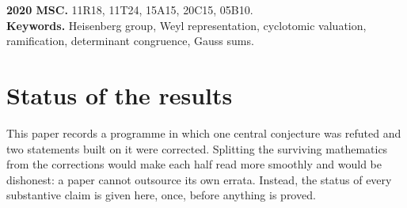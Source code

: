 \documentclass[11pt]{article}
\theoremstyle{plain}
\theoremstyle{definition}
\newcommand{\tr}{\operatorname{tr}}
\newcommand{\vlam}{v_\lambda}
\begin{document}
\begin{abstract}
The congruence reduces to an identity about the power sums $\tr(D^m)$, and the
main structural result of the paper concerns those. Expanding $\tr(D^m)$ over
$m$-tuples of total displacement zero and grouping by cyclic orbit gives
classes $S_d$ indexed by the divisors of $m$. We prove a \emph{sieve theorem}:
if $e$ denotes the order of the generating character and $t\mid m$ satisfies
$m/t$ odd and $e\mid(m/t)$, then
\[
\sum_{d\mid t} d\,S_d \;=\; q\Bigl(\sum_{v\neq0}d_v^{\,m/t}\Bigr)^{t}\;=\;0 .
\]
Two apparently separate phenomena are its corollaries. When $m$ is odd the
index set of relations is downward closed, M\"obius inversion runs, and each
$S_d$ with $e\mid(m/d)$ vanishes identically; when $m$ is even it is not, and
the theorem degenerates to a single relation. The sieve system is triangular
along divisibility, so its rank is the number of relations and the number of
unconstrained classes is $\tau(m)-\#\{u\mid m: u\text{ odd},\ e\mid u\}$,
reduced by one more when $p\nmid m$ because then the period-one class is empty.
Consequently $\mathrm{free}(1)=0$, while $\mathrm{free}(m)=1$ precisely when
$m$ is a positive power of $p$ or a prime different from $p$. Finally $d\,S_d$ has the
closed form $q\sum_{c\mid d}\mu(d/c)\bigl(\sum_v d_v^{\,m/c}\bigr)^{c}$, from
which the sieve theorem follows in two lines. At $q=3$, the complete section
space realizes only six normalized cubic recurrences; their states modulo $9$
prove
$\min_c\vlam(\tr D_c^m)=2(m+[m\text{ odd}])$ for every $m\ge2$. This
$q=3$ theorem does not determine the minimum at $q\ge5$.
\end{abstract}

\noindent\textbf{2020 MSC.} 11R18, 11T24, 15A15, 20C15, 05B10.\\
\textbf{Keywords.} Heisenberg group, Weyl representation, cyclotomic
valuation, ramification, determinant congruence, Gauss sums.

\section*{Status of the results}

This paper records a programme in which one central conjecture was refuted and
two statements built on it were corrected. Splitting the surviving mathematics
from the corrections would make each half read more smoothly and would be
dishonest: a paper cannot outsource its own errata. Instead, the status of every
substantive claim is given here, once, before anything is proved.
\end{document}
